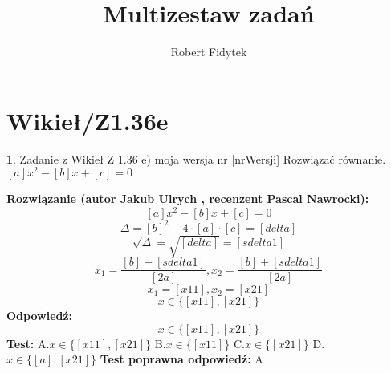\documentclass[12pt, a4paper]{article}
\title{Multizestaw zadań}
\author{Robert Fidytek}
\date{}
\theoremstyle{definition} %
\newtheorem{zad}{}
\newcommand{\kategoria}[1]{\section{#1}} %
\newcommand{\zadStart}[1]{\begin{zad}#1\newline} %
\newcommand{\zadStop}{\end{zad}}   %
\newcommand{\rozwStart}[2]{\noindent \textbf{Rozwiązanie (autor #1 , recenzent #2): }\newline} %
\newcommand{\rozwStop}{\newline}                                            %
\newcommand{\odpStart}{\noindent \textbf{Odpowiedź:}\newline}    %
\newcommand{\odpStop}{\newline}                                             %
\newcommand{\testStart}{\noindent \textbf{Test:}\newline} %
\newcommand{\testStop}{\newline} %
\newcommand{\kluczStart}{\noindent \textbf{Test poprawna odpowiedź:}\newline} %
\newcommand{\kluczStop}{\newline} %
\begin{document}
\maketitle


\kategoria{Wikieł/Z1.36e}
\zadStart{Zadanie z Wikieł Z 1.36 e) moja wersja nr [nrWersji]}
Rozwiązać równanie. $[a]x^{2}-[b]x+[c]=0$
\zadStop
\rozwStart{Jakub Ulrych}{Pascal Nawrocki}
$$[a]x^{2}-[b]x+[c]=0$$
$$\Delta=[b]^{2}-4\cdot[a]\cdot[c]=[delta]$$
$$\sqrt{\Delta}=\sqrt{[delta]}=[sdelta1]$$
$$x_{1}=\frac{[b]-[sdelta1]}{[2a]},x_{2}=\frac{[b]+[sdelta1]}{[2a]}$$
$$x_{1}=[x11],x_{2}=[x21]$$
$$x\in\{[x11],[x21]\}$$
\rozwStop
\odpStart
$$x\in\{[x11],[x21]\}$$
\odpStop
\testStart
A.$x\in\{[x11],[x21]\}$
B.$x\in\{[x11]\}$
C.$x\in\{[x21]\}$
D.$x\in\{[a],[x21]\}$
\testStop
\kluczStart
A
\kluczStop
\end{document}
